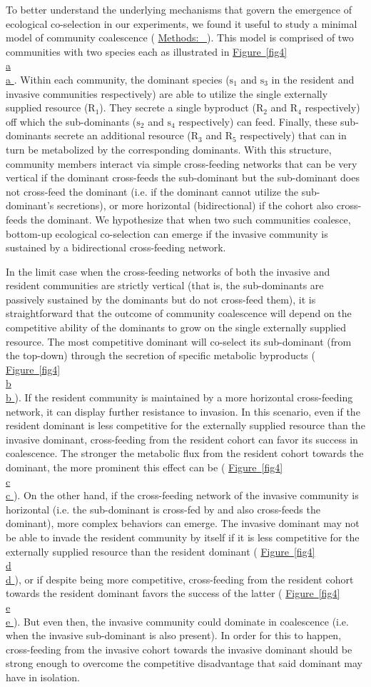 \documentclass[a4paper,10pt]{article}
\newcommand{\figref}[2][]{%
  \hyperref[{#2}]{%
    Figure~\ref*{#2}%
    \ifx\\#1\\%
    \else
      #1%
    \fi
  }%
}
\newcommand{\methodsref}[1]{%
  \hyperref[{methods:#1}]{%
   Methods:~\nameref*{methods:#1}%
  }%
}
\begin{document}
To better understand the underlying mechanisms that govern
the emergence of ecological co-selection in our experiments,
we found it useful to study a minimal model of community coalescence
(\methodsref{sim-min}).
This model is comprised of two communities with two species each
as illustrated in \figref[a]{fig4}.
Within each community, the dominant species
($\mathrm{s}_1$ and $\mathrm{s}_3$ in the resident and invasive communities
respectively)
are able to utilize the single externally supplied resource ($\mathrm{R}_1$).
They secrete a single byproduct
($\mathrm{R}_2$ and $\mathrm{R}_4$ respectively)
off which
the sub-dominants ($\mathrm{s}_2$ and $\mathrm{s}_4$ respectively) can feed.
Finally, these sub-dominants secrete an additional resource
($\mathrm{R}_3$ and $\mathrm{R}_5$ respectively)
that can in turn
be metabolized by the corresponding dominants.
With this structure, community members interact via simple cross-feeding networks that can be
very vertical if the dominant cross-feeds the sub-dominant but the sub-dominant does not cross-feed
the dominant (i.e. if the dominant cannot utilize the sub-dominant's secretions),
or more horizontal (bidirectional) if the cohort also cross-feeds the dominant.
We hypothesize that when two such communities coalesce,
bottom-up ecological co-selection can emerge if the invasive community is
sustained by a bidirectional cross-feeding network.

In the limit case when the cross-feeding networks of both the invasive and resident communities
are strictly vertical (that is, the sub-dominants are passively sustained by the dominants
but do not cross-feed them),
it is straightforward that the outcome of community coalescence will depend on the competitive
ability of the dominants to grow on the single externally supplied resource.
The most competitive dominant will co-select its sub-dominant (from the top-down)
through the secretion of specific metabolic byproducts
(\figref[b]{fig4}).
If the resident community is maintained by a more horizontal cross-feeding network,
it can display further resistance to invasion.
In this scenario, even if the resident dominant is less competitive for the externally supplied resource
than the invasive dominant,
cross-feeding from the resident cohort can favor its success in coalescence.
The stronger the metabolic flux from the resident cohort towards the dominant,
the more prominent this effect can be
(\figref[c]{fig4}).
On the other hand, if the cross-feeding network of the invasive community is horizontal
(i.e. the sub-dominant is cross-fed by and also cross-feeds the dominant),
more complex behaviors can emerge.
The invasive dominant may not be able to invade the resident community by itself
if it is less competitive for the externally supplied resource than the resident dominant
(\figref[d]{fig4}),
or if despite being more competitive, cross-feeding from the resident cohort towards
the resident dominant favors the success of the latter
(\figref[e]{fig4}).
But even then, the invasive community could dominate in coalescence (i.e. when the invasive
sub-dominant is also present).
In order for this to happen, cross-feeding from the invasive cohort towards the invasive dominant
should be strong enough to overcome the competitive disadvantage that said dominant
may have in isolation.
\end{document}
